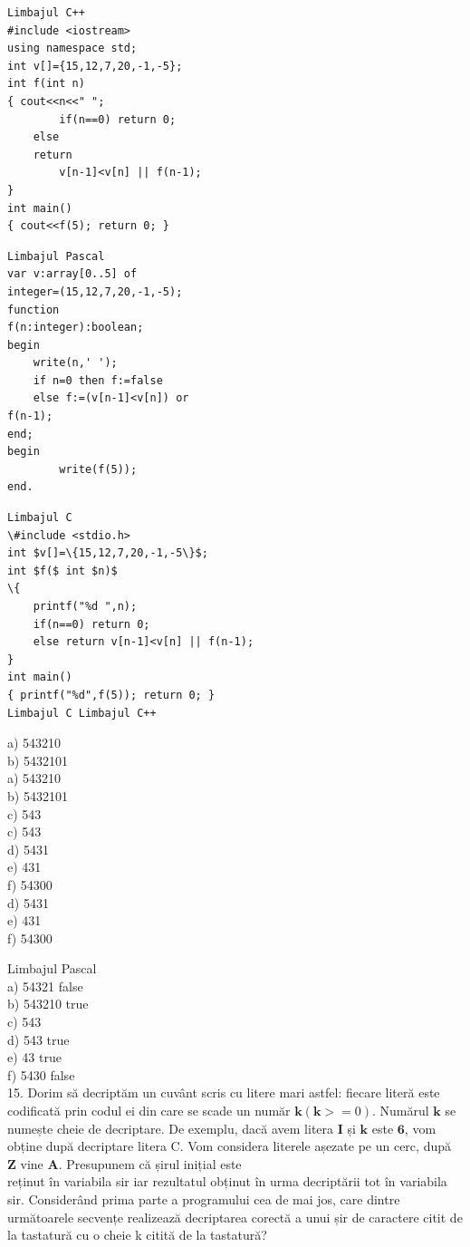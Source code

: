 \documentclass[10pt]{article}
\begin{document}
\begin{verbatim}
Limbajul C++
#include <iostream>
using namespace std;
int v[]={15,12,7,20,-1,-5};
int f(int n)
{ cout<<n<<" ";
        if(n==0) return 0;
    else
    return
        v[n-1]<v[n] || f(n-1);
}
int main()
{ cout<<f(5); return 0; }
\end{verbatim}

\begin{verbatim}
Limbajul Pascal
var v:array[0..5] of
integer=(15,12,7,20,-1,-5);
function
f(n:integer):boolean;
begin
    write(n,' ');
    if n=0 then f:=false
    else f:=(v[n-1]<v[n]) or
f(n-1);
end;
begin
        write(f(5));
end.
\end{verbatim}

\begin{verbatim}
Limbajul C
\#include <stdio.h>
int $v[]=\{15,12,7,20,-1,-5\}$;
int $f($ int $n)$
\{
    printf("%d ",n);
    if(n==0) return 0;
    else return v[n-1]<v[n] || f(n-1);
}
int main()
{ printf("%d",f(5)); return 0; }
Limbajul C Limbajul C++
\end{verbatim}

a) 543210\\
b) 5432101\\
a) 543210\\
b) 5432101\\
c) 543\\
c) 543\\
d) 5431\\
e) 431\\
f) 54300\\
d) 5431\\
e) 431\\
f) 54300

Limbajul Pascal\\
a) 54321 false\\
b) 543210 true\\
c) 543\\
d) 543 true\\
e) 43 true\\
f) 5430 false\\
15. Dorim să decriptăm un cuvânt scris cu litere mari astfel: fiecare literă este codificată prin codul ei din care se scade un număr $\mathbf{k}(\mathbf{k}>=0)$. Numărul $\mathbf{k}$ se numește cheie de decriptare. De exemplu, dacă avem litera $\mathbf{I}$ și $\mathbf{k}$ este $\mathbf{6}$, vom obține după decriptare litera C. Vom considera literele așezate pe un cerc, după $\mathbf{Z}$ vine $\mathbf{A}$. Presupunem că șirul inițial este\\
reținut în variabila sir iar rezultatul obținut în urma decriptării tot în variabila sir. Considerând prima parte a programului cea de mai jos, care dintre următoarele secvențe realizează decriptarea corectă a unui șir de caractere citit de la tastatură cu o cheie k citită de la tastatură?
\end{document}
